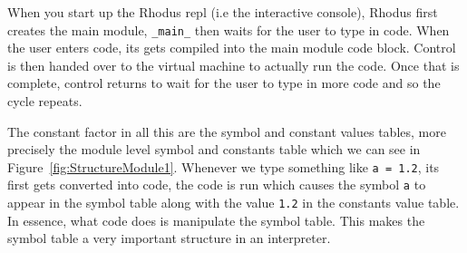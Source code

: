 %



When you start up the Rhodus repl (i.e the interactive console), Rhodus first creates the main module, {\tt _main_} then waits for the user to type in code. When the user enters code, its gets compiled into the main module code block. Control is then handed over to the virtual machine to actually run the code. Once that is complete, control returns to wait for the user to type in more code and so the cycle repeats.

The constant factor in all this are the symbol and constant values tables, more precisely the module level symbol and constants table which we can see in Figure~\ref{fig:StructureModule1}. Whenever we type something like {\tt a = 1.2}, its first gets converted into code, the code is run which causes the symbol {\tt a} to appear in the symbol table along with the value {\tt 1.2} in the constants value table. In essence, what code does is manipulate the symbol table. This makes the symbol table a very important structure in an interpreter.

